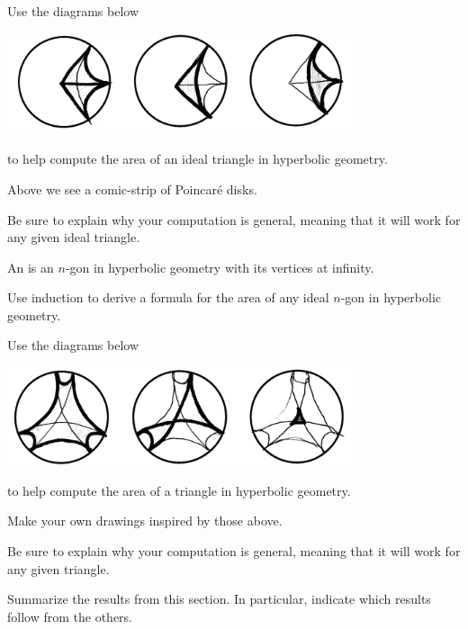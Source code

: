 \documentclass{ximera}
\begin{document}
\begin{problem}
  Use the diagrams below
  \begin{image}
  \includegraphics[width=4in]{diagramOfIdealTri.png}
  \end{image}
  to help compute the area of an ideal triangle in hyperbolic geometry.
  \begin{hint}
    Above we see a comic-strip of Poincar\'e disks.
  \end{hint}
  \begin{hint}
    Be sure to explain why your computation is general, meaning that
    it will work for any given ideal triangle.
  \end{hint}
\end{problem}


\begin{definition}
  An  is an $n$-gon in hyperbolic
  geometry with its vertices at infinity.
\end{definition}

\begin{problem}
Use induction to derive a formula for the area of any ideal $n$-gon in
hyperbolic geometry.
\end{problem}

\begin{problem}
  Use the diagrams below
  \begin{image}
  \includegraphics[width=4in]{diagramHex.png}
  \end{image}
  to help compute the area of a triangle in hyperbolic geometry.
  \begin{hint}
    Make your own drawings inspired by those above.
  \end{hint}
    \begin{hint}
    Be sure to explain why your computation is general, meaning that
    it will work for any given triangle.
  \end{hint}
\end{problem}


\begin{problem}
Summarize the results from this section. In particular, indicate which
results follow from the others.
\begin{freeResponse}
\end{freeResponse}
\end{problem}
\end{document}
